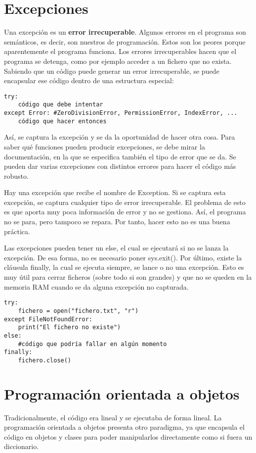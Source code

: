 \section{Excepciones}
Una excepción es un \textbf{error irrecuperable}. Algunos errores en el programa son semánticos, es decir, son nuestros de programación. Estos son los peores porque aparentemente el programa funciona. Los errores irrecuperables hacen que el programa se detenga, como por ejemplo acceder a un fichero que no exista. Sabiendo que un código puede generar un error irrecuperable, se puede encapsular ese código dentro de una estructura especial:
\begin{lstlisting}
try:
	código que debe intentar
except Error: #ZeroDivisionError, PermissionError, IndexError, ...
	código que hacer entonces
\end{lstlisting}
Así, se captura la excepción y se da la oportunidad de hacer otra cosa. Para saber qué funciones pueden producir excepciones, se debe mirar la documentación, en la que se especifica también el tipo de error que se da. Se pueden dar varias excepciones con distintos errores para hacer el código más robusto.

Hay una excepción que recibe el nombre de Exception. Si se captura esta excepción, se captura cualquier tipo de error irrecuperable. El problema de esto es que aporta muy poca información de error y no se gestiona. Así, el programa no se para, pero tampoco se repara. Por tanto, hacer esto no es una buena práctica. 

Las excepciones pueden tener un else, el cual se ejecutará si no se lanza la excepción. De esa forma, no es necesario poner sys.exit(). Por último, existe la cláusula finally, la cual se ejecuta siempre, se lance o no una excepción. Esto es muy útil para cerrar ficheros (sobre todo si son grandes) y que no se queden en la memoria RAM cuando se da alguna excepción no capturada. 
\begin{lstlisting}
try:
	fichero = open("fichero.txt", "r")
except FileNotFoundError:
	print("El fichero no existe")
else:
	#código que podría fallar en algún momento
finally:
	fichero.close()
\end{lstlisting}

\section{Programación orientada a objetos}
Tradicionalmente, el código era lineal y se ejecutaba de forma lineal. La programación orientada a objetos presenta otro paradigma, ya que encapsula el código en objetos y clases para poder manipularlos directamente como si fuera un diccionario.
